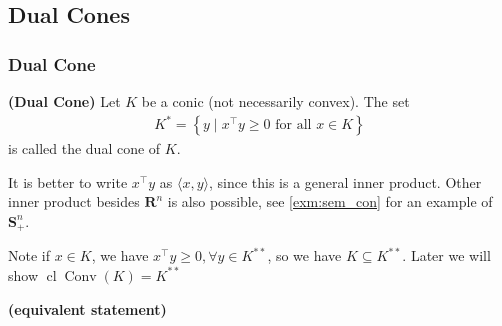 \documentclass{article}
\newcommand{\bfs}[1]{\textbf{({#1}) }}
\newcommand{\Conv}{\operatorname{Conv}}
\newcommand{\cl}{\operatorname{cl}}
\begin{document}
\subsection{Dual Cones}
\subsubsection{Dual Cone}
\begin{defa}{\bfs{Dual Cone}}\label{def:dualc}
  Let $K$ be a conic (not necessarily convex). The set
\begin{align*} 
K^{*}=\left\{y \mid x^{\top}y \geq 0 \text { for all } x \in K\right\}
\end{align*}
is called the dual cone of $K$. 
\end{defa}
\begin{rema}
 It is better to write $x^{\top}y$ as $\langle x, y\rangle$, since this is a general inner product. Other inner product besides $\mathbf{R}^n$ is also possible, see \cref{exm:sem_con} for an example of $\mathbf{S}_{+}^{n}$.
\end{rema}
\begin{rema}
Note if $x\in K$, we have $x^{\top}y\ge 0, \forall y\in K^{**}$, so we have $K\subseteq K^{**}$. Later we will show  $\cl \Conv(K)= K^{**}$
\end{rema}
\begin{rema}{\bfs{equivalent statement}}

\centerline{}
\end{rema}
\end{document}
